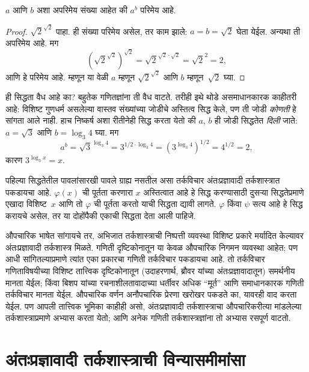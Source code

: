 \begin{thm}
$a$ आणि $b$ अशा अपरिमेय संख्या आहेत की $a^b$ परिमेय आहे.
\end{thm}

\begin{proof}
$\sqrt{2}^{\sqrt{2}}$ पाहा. ही संख्या परिमेय असेल,
तर काम झाले: $a = b = \sqrt{2}$ घेता येईल. अन्यथा
ती अपरिमेय आहे. मग
\[(\sqrt{2}^{\sqrt{2}})^{\sqrt{2}} = \sqrt{2}^{\sqrt{2} \cdot
  \sqrt{2}} = \sqrt{2}^2 = 2,
\]
आणि हे परिमेय आहे. म्हणून या वेळी $a$ म्हणून
$\sqrt{2}^{\sqrt{2}}$ आणि $b$ म्हणून~$\sqrt 2$ घ्या.
\end{proof}

ही सिद्धता वैध आहे का? बहुतेक गणितज्ञांना ती वैध
वाटते. तरीही इथे थोडे असमाधानकारक काहीतरी आहे:
विशिष्ट गुणधर्म असलेल्या वास्तव संख्यांच्या जोडीचे
अस्तित्व सिद्ध केले, पण ती जोडी \emph{कोणती} हे
सांगता आले नाही. हाच निष्कर्ष अशा रीतीनेही सिद्ध
करता येतो की $a$, $b$ ही जोडी सिद्धतेत \emph{दिली}
जाते: $a = \sqrt{3}$ आणि $b = \log_3 4$ घ्या. मग
\[a^b = \sqrt{3}^{\log_3 4} = 3^{1/2 \cdot \log_3 4} = (3^{\log_3
  4})^{1/2} = 4^{1/2}= 2,
\]
कारण $3^{\log_3 x} = x$.

पहिल्या सिद्धतेतील पावलांसारखी पावले ग्राह्य नसतील
असा तर्कविचार अंतःप्रज्ञावादी तर्कशास्त्रात पकडायचा
आहे. $\varphi(x)$ ची पूर्तता करणारा $x$ अस्तित्वात आहे
हे सिद्ध करण्यासाठी दुसऱ्या सिद्धतेप्रमाणे एखादा
विशिष्ट~$x$ आणि तो $\varphi$ ची पूर्तता करतो याची
सिद्धता द्यावी लागते. $\varphi$ किंवा $\psi$ सत्य आहे
हे सिद्ध करायचे असेल, तर या दोहोंपैकी एकाची
सिद्धता देता आली पाहिजे.

औपचारिक भाषेत सांगायचे तर, अभिजात तर्कशास्त्राची
निष्पत्ती व्यवस्था विशिष्ट प्रकारे मर्यादित
केल्यावर अंतःप्रज्ञावादी तर्कशास्त्र मिळते. गणिती
दृष्टिकोनातून या केवळ औपचारिक निगमन व्यवस्था
आहेत; पण आधी सांगितल्याप्रमाणे त्यांत एका प्रकारचा
गणिती तर्कविचार पकडायचा आहे. तो तर्कविचार
गणिताविषयीच्या विशिष्ट तात्त्विक दृष्टिकोनातून
(उदाहरणार्थ, ब्रौवर यांच्या अंतःप्रज्ञावादातून)
समर्थनीय मानता येईल; किंवा बिशप यांच्या
रचनाशीलतावादाच्या धर्तीवर अधिक ``मूर्त'' आणि
समाधानकारक गणिती तर्कविचार मानता येईल. औपचारिक
वर्णन अनौपचारिक प्रेरणा खरोखर पकडते का, यावरही
वाद करता येईल. पण आपली तात्त्विक भूमिका काहीही
असो, अंतःप्रज्ञावादी तर्कशास्त्राचा औपचारिकरीत्या
मांडलेल्या तर्कशास्त्राप्रमाणे अभ्यास करता येतो;
आणि अनेक गणिती तर्कशास्त्रज्ञांना तो अभ्यास
रसपूर्ण वाटतो.












\section{अंतःप्रज्ञावादी तर्कशास्त्राची विन्यासमीमांसा}\label{int:int:syn:sec}

